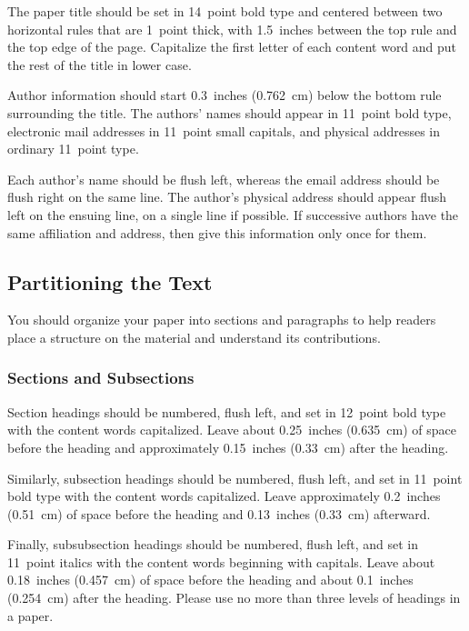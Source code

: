 \documentclass[11pt,letterpaper]{article}
\begin{document}
The paper title should be set in 14~point bold type and centered
between two horizontal rules that are 1~point thick, with 1.5~inches
between the top rule and the top edge of the page. Capitalize the
first letter of each content word and put the rest of the title in 
lower case.

Author information should start 0.3~inches (0.762~cm) below the bottom
rule surrounding the title. The authors' names should appear in
11~point bold type, electronic mail addresses in 11~point small
capitals, and physical addresses in ordinary 11~point type.

Each author's name should be flush left, whereas the email address
should be flush right on the same line. The author's physical address
should appear flush left on the ensuing line, on a single line if
possible. If successive authors have the same affiliation and address, 
then give this information only once for them. 

\subsection{Partitioning the Text} 

You should organize your paper into sections and paragraphs to help 
readers place a structure on the material and understand its 
contributions. 

\vspace{-0.018in}
\subsubsection{Sections and Subsections}
\vspace{-0.015in}

Section headings should be numbered, flush left, and set in 12~point 
bold type with the content words capitalized. Leave about 0.25~inches
(0.635~cm) of space before the heading and approximately 0.15~inches 
(0.33~cm) after the heading.

Similarly, subsection headings should be numbered, flush left, and 
set in 11~point bold type with the content words capitalized. Leave
approximately 0.2~inches (0.51~cm) of space before the heading and 
0.13~inches (0.33~cm) afterward.

Finally, subsubsection headings should be numbered, flush left, and
set in 11~point italics with the content words beginning with capitals. 
Leave about 0.18~inches (0.457~cm) of space before the heading and
about 0.1~inches (0.254~cm) after the heading. Please use no more 
than three levels of headings in a paper.
\end{document}
